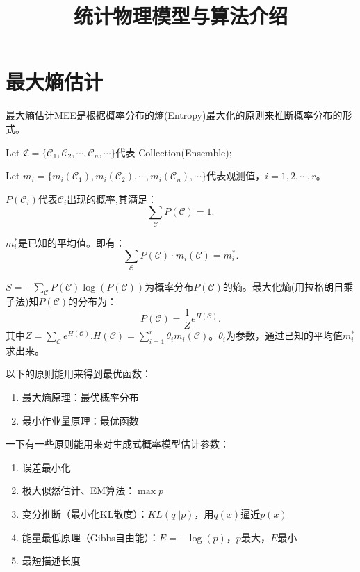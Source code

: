\documentclass[normal,cn, 11pt]{elegantnote}
\title { 统计物理模型与算法介绍 }
\date {}
\begin{document}
\maketitle

\section{最大熵估计}\label{sec:max-entro}
最大熵估计MEE是根据概率分布的熵(Entropy)最大化的原则来推断概率分布的形式。

Let $\mathfrak{C} = \{\mathcal{C}_1, \mathcal{C}_2, \cdots, \mathcal{C}_n, \cdots\}$代表 Collection(Ensemble);

Let $m_i = \{m_i(\mathcal{C}_1),m_i(\mathcal{C}_2), \cdots, m_i(\mathcal{C}_n), \cdots\}$代表观测值，$i = 1,2,\cdots,r$。

$P(\mathcal{C}_i)$代表$\mathcal{C}_i$出现的概率,其满足：
\begin{equation}\label{eq:p-sum}
  \sum\limits_{\mathcal{C}} P(\mathcal{C}) = 1.
\end{equation}

$m_i^\ast$是已知的平均值。即有：
\begin{equation}\label{eq:pingjun}
  \sum\limits_{\mathcal{C}} P(\mathcal{C})\cdot m_i(\mathcal{C}) =  m_i^\ast .
\end{equation}

$S = - \sum\limits_{\mathcal{C}}P(\mathcal{C})\log(P(\mathcal{C}))$为概率分布$P(\mathcal{C})$的熵。最大化熵(用拉格朗日乘子法)知$P(\mathcal{C})$的分布为：
\begin{equation}\label{eq:boltzmann}
  P(\mathcal{C}) = \frac{1}{Z} e^{H(\mathcal{C})}.
\end{equation}
其中$Z = \sum\limits_{\mathcal{C}}e^{H(\mathcal{C})}$,$H(\mathcal{C})=\sum_{i=1}^{r}\theta_i m_i(\mathcal{C})$。$\theta_i$为参数，通过已知的平均值$m_i^\ast$求出来。

\begin{note}
以下的原则能用来得到最优函数：
\begin{enumerate}
  \item 最大熵原理：最优概率分布
  \item 最小作业量原理：最优函数
\end{enumerate}
\end{note}

\begin{note}
一下有一些原则能用来对生成式概率模型估计参数：
\begin{enumerate}
  \item 误差最小化
  \item 极大似然估计、EM算法：$\max p$
  \item 变分推断（最小化KL散度）：$KL(q||p)$，用$q(x)$逼近$p(x)$
  \item 能量最低原理（Gibbs自由能）：$E= -\log(p)$，$p$最大，$E$最小
  \item 最短描述长度
\end{enumerate}
\end{note}
\end{document}

